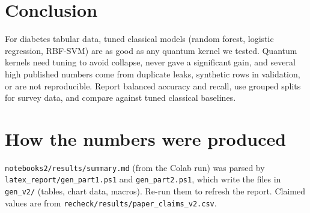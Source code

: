 \documentclass[11pt,a4paper]{article}
\begin{document}
\section{Conclusion}
For diabetes tabular data, tuned classical models (random forest, logistic regression, RBF-SVM) are as good as any quantum kernel we tested. Quantum kernels need tuning to avoid collapse, never gave a significant gain, and several high published numbers come from duplicate leaks, synthetic rows in validation, or are not reproducible. Report balanced accuracy and recall, use grouped splits for survey data, and compare against tuned classical baselines.

\appendix\section{How the numbers were produced}
\texttt{notebooks2/results/summary.md} (from the Colab run) was parsed by \texttt{latex\_report/gen\_part1.ps1} and \texttt{gen\_part2.ps1}, which write the files in \texttt{gen\_v2/} (tables, chart data, macros). Re-run them to refresh the report. Claimed values are from \texttt{recheck/results/paper\_claims\_v2.csv}.
\end{document}

